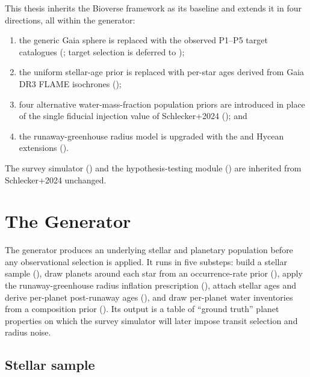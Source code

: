This thesis inherits the Bioverse framework as its baseline and
extends it in four directions, all within the generator:
\begin{enumerate}
    \item the generic Gaia sphere is replaced with the observed
        \PLATO P1--P5 target catalogues (;
        target selection is deferred to );
    \item the uniform stellar-age prior is replaced with per-star
        ages derived from Gaia DR3 FLAME isochrones
        ();
    \item four alternative water-mass-fraction population priors are
        introduced in place of the single fiducial injection value
        of Schlecker+2024 (); and
    \item the runaway-greenhouse radius model is upgraded with the
        \textcite{Aguichine2021} and Hycean extensions
        ().
\end{enumerate}
The survey simulator () and the
hypothesis-testing module () are
inherited from Schlecker+2024 unchanged.


\section{The Generator}
\label{sec:generator}

The generator produces an underlying stellar and planetary population
before any observational selection is applied.  It runs in five
substeps: build a stellar sample (), draw
planets around each star from an occurrence-rate prior
(), apply the runaway-greenhouse radius
inflation prescription (), attach stellar
ages and derive per-planet post-runaway ages
(), and draw per-planet water inventories
from a composition prior ().  Its output
is a table of ``ground truth'' planet properties on which the survey
simulator will later impose transit selection and radius noise.


\subsection{Stellar sample}
\label{ssec:bioverse_stars}

